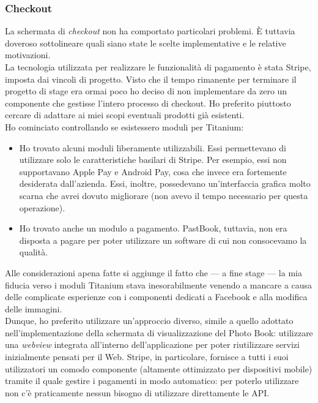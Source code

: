 			\subsubsection{Checkout}
				La schermata di \emph{checkout} non ha comportato particolari problemi. È tuttavia doveroso sottolineare quali siano
				state le scelte implementative e le relative motivazioni.\\
				La tecnologia utilizzata per realizzare le funzionalità di pagamento è stata Stripe, imposta dai vincoli di progetto.
				Visto che il tempo rimanente per terminare il progetto di stage era ormai poco ho deciso di non implementare
				da zero un componente che gestisse l'intero processo di checkout. Ho preferito piuttosto cercare di adattare ai miei
				scopi eventuali prodotti già esistenti.\\
				Ho cominciato controllando se esistessero moduli per Titanium:
				\begin{itemize}
					\item Ho trovato alcuni moduli liberamente utilizzabili. Essi permettevano di utilizzare solo le
					caratteristiche basilari di Stripe. Per esempio, essi non supportavano Apple Pay e Android Pay, cosa che
					invece era fortemente desiderata dall'azienda. Essi, inoltre, possedevano un'interfaccia grafica molto
					scarna che avrei dovuto migliorare (non avevo il tempo necessario per questa operazione).
					\item Ho trovato anche un modulo a pagamento. PastBook, tuttavia, non era disposta a pagare per poter
					utilizzare un software di cui non consocevamo la qualità.
				\end{itemize}
				Alle considerazioni apena fatte si aggiunge il fatto che — a fine stage — la mia fiducia verso i moduli Titanium
				stava inesorabilmente venendo a mancare a causa delle complicate esperienze con i componenti dedicati a Facebook e
				alla modifica delle immagini.\\
				Dunque, ho preferito utilizzare un'approccio diverso, simile a quello adottato nell'implementazione della schermata
				di visualizzazione del Photo Book: utilizzare una \emph{webview} integrata all'interno dell'applicazione per poter
				riutilizzare servizi inizialmente pensati per il Web. Stripe, in particolare, fornisce a tutti i suoi
				utilizzatori un comodo componente (altamente ottimizzato per dispositivi mobile) tramite il quale gestire i pagamenti
				in modo automatico: per poterlo utilizzare non c'è praticamente nessun bisogno di utilizzare direttamente le API.
